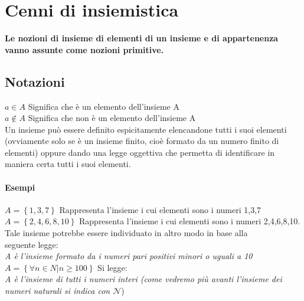 \section{Cenni di insiemistica}
\textbf{Le nozioni di insieme di elementi di un insieme e di appartenenza vanno assunte come nozioni primitive.}\\

\subsection{Notazioni}
	\begin{math}
	 a\in A
	\end{math}
 Significa che è un elemento dell'insieme A\\
	\begin{math}
	 a\notin A
	\end{math}
 Significa che non è un elemento dell'insieme A\\
 Un insieme può essere definito espicitamente elencandone tutti i suoi elementi (ovviamente solo se è un insieme finito, cioè formato da un numero finito di elementi) oppure dando una legge oggettiva che permetta di identificare in maniera certa tutti i suoi elementi.
 
 \paragraph{Esempi}
 	\begin{math}
 	 A=\left\{{1,3,7}\right\}
 	\end{math}
 Rappresenta l'insieme i cui elementi sono i numeri 1,3,7\\
\begin{math}
 	 A=\left\{{2,4,6,8,10}\right\}
 	\end{math}
 Rappresenta l'insieme i cui elementi sono i numeri 2,4,6,8,10. Tale insieme potrebbe essere individuato in altro modo in base alla\\
 seguente legge:\\
\textit{ A è l'insieme formato da i numeri pari positivi minori o uguali a 10}\\
 	\begin{math}
 	 A=\left\{{\forall n \in N| n\geq100}\right\}
 	\end{math} 
 Si legge:\\
 \textit{ A è l'insieme di tutti i numeri interi (come vedremo più avanti l'insieme dei numeri naturali si indica con $\mathcal{N}$})\\
 
